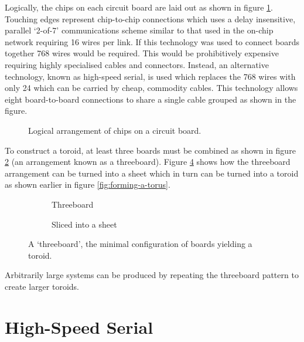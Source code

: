 			Logically, the chips on each circuit board are laid out as shown in figure
			\ref{fig:chipsOnBoard}. Touching edges represent chip-to-chip connections
			which uses a delay insensitive, parallel `2-of-7' communications scheme
			similar to that used in the on-chip network requiring 16 wires per link.
			If this technology was used to connect boards together 768 wires would be
			required.  This would be prohibitively expensive requiring highly
			specialised cables and connectors. Instead, an alternative technology,
			known as high-speed serial, is used which replaces the 768 wires with only
			24 which can be carried by cheap, commodity cables. This technology allows
			eight board-to-board connections to share a single cable grouped as shown in
			the figure.
			
			\begin{figure}
				\center
				
				\caption{Logical arrangement of chips on a circuit board.}
				\label{fig:chipsOnBoard}
			\end{figure}
			
			To construct a toroid, at least three boards must be combined as shown in
			figure \ref{fig:threeboard} (an arrangement known as a threeboard).
			Figure \ref{fig:threeboardSliced} shows how the threeboard arrangement can
			be turned into a sheet which in turn can be turned into a toroid as shown
			earlier in figure \ref{fig:forming-a-torus}.
			
			\begin{figure}
				\begin{subfigure}[b]{0.45\textwidth}
					\center
					
					\caption{Threeboard}
					\label{fig:threeboard}
				\end{subfigure}
				\begin{subfigure}[b]{0.45\textwidth}
					\center
					
					\caption{Sliced into a sheet}
					\label{fig:threeboardSliced}
				\end{subfigure}
				
				\caption[A `threeboard'.]{A `threeboard', the minimal configuration of
				boards yielding a toroid.}
			\end{figure}
			
			Arbitrarily large systems can be produced by repeating the threeboard
			pattern to create larger toroids.
	
	\break
	\section{High-Speed Serial}
		
